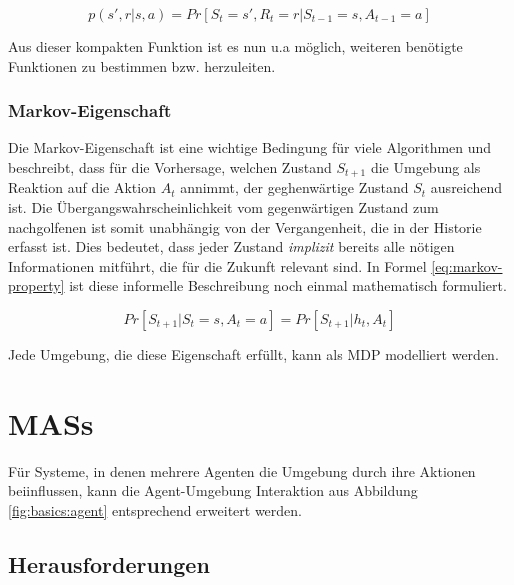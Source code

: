 		\begin{equation}
			p(s', r | s, a) = Pr[ S_t = s', R_t = r | S_{t-1} = s, A_{t-1} = a ]
		\end{equation}
	
		Aus dieser kompakten Funktion ist es nun u.a möglich, weiteren benötigte Funktionen zu bestimmen bzw. herzuleiten. 
		
		\subsubsection{Markov-Eigenschaft}
		
			Die Markov-Eigenschaft ist eine wichtige Bedingung für viele Algorithmen und beschreibt, dass für die Vorhersage, welchen Zustand $S_{t+1}$ die Umgebung als Reaktion auf die Aktion $A_t$ annimmt, der geghenwärtige Zustand $S_t$ ausreichend ist. Die Übergangswahrscheinlichkeit vom gegenwärtigen Zustand zum nachgolfenen ist somit unabhängig von der Vergangenheit, die in der Historie erfasst ist.
			Dies bedeutet, dass jeder Zustand \textit{implizit} bereits alle nötigen Informationen mitführt, die für die Zukunft relevant sind.
			In Formel \ref{eq:markov-property} ist diese informelle Beschreibung noch einmal mathematisch formuliert.
			
			\begin{equation} \label{eq:markov-property}
				Pr[S_{t+1} | S_t = s, A_t = a] = Pr[S_{t+1} | h_t, A_t]
			\end{equation}
			
			Jede Umgebung, die diese Eigenschaft erfüllt, kann als \ac{MDP} modelliert werden.


\section{\aclp{MAS}}

	Für Systeme, in denen mehrere Agenten die Umgebung durch ihre Aktionen beiinflussen, kann die Agent-Umgebung Interaktion aus Abbildung \ref{fig:basics:agent} entsprechend erweitert werden.

	\subsection{}

	\subsection{Herausforderungen}
	
	